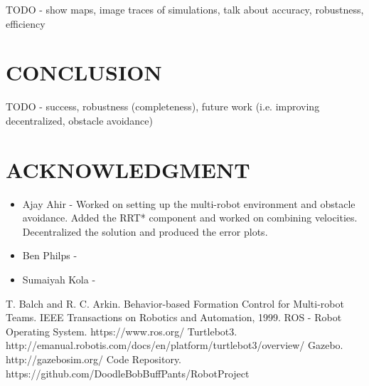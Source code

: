 \documentclass[letterpaper, 10 pt, conference]{ieeeconf}  %
\begin{document}
TODO - show maps, image traces of simulations, talk about accuracy, robustness, efficiency

\section{CONCLUSION}

TODO - success, robustness (completeness), future work (i.e. improving decentralized, obstacle avoidance)

\addtolength{\textheight}{-12cm}   %


\section{ACKNOWLEDGMENT}

\begin{itemize}
\item Ajay Ahir - Worked on setting up the multi-robot environment and obstacle avoidance. Added the RRT* component and worked on combining velocities. Decentralized the solution and produced the error plots.
\item Ben Philps - 
\item Sumaiyah Kola - 
\end{itemize}


\begin{thebibliography}{99}

 T. Balch and R. C. Arkin. Behavior-based Formation Control for Multi-robot Teams. IEEE Transactions on Robotics and Automation, 1999.
 ROS - Robot Operating System. https://www.ros.org/
 Turtlebot3. http://emanual.robotis.com/docs/en/platform/turtlebot3/overview/
 Gazebo. http://gazebosim.org/
 Code Repository. https://github.com/DoodleBobBuffPants/RobotProject

\end{thebibliography}
\end{document}
